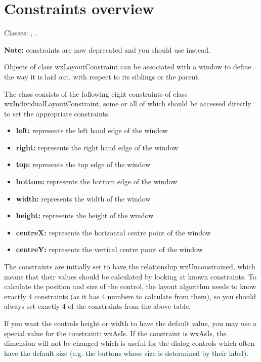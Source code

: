 \section{Constraints overview}\label{constraintsoverview}

Classes: , .

{\bf Note:} constraints are now deprecated and you should use  instead.

Objects of class wxLayoutConstraint can be associated with a window to define
the way it is laid out, with respect to its siblings or the parent.

The class consists of the following eight constraints of class wxIndividualLayoutConstraint,
some or all of which should be accessed directly to set the appropriate
constraints.

\begin{itemize}\itemsep=0pt
\item {\bf left:} represents the left hand edge of the window
\item {\bf right:} represents the right hand edge of the window
\item {\bf top:} represents the top edge of the window
\item {\bf bottom:} represents the bottom edge of the window
\item {\bf width:} represents the width of the window
\item {\bf height:} represents the height of the window
\item {\bf centreX:} represents the horizontal centre point of the window
\item {\bf centreY:} represents the vertical centre point of the window
\end{itemize}

The constraints are initially set to have the relationship wxUnconstrained,
which means that their values should be calculated by looking at known constraints.
To calculate the position and size of the control, the layout algorithm needs to
know exactly 4 constraints (as it has 4 numbers to calculate from them), so you
should always set exactly 4 of the constraints from the above table.

If you want the controls height or width to have the default value, you may use
a special value for the constraint: wxAsIs. If the constraint is wxAsIs, the
dimension will not be changed which is useful for the dialog controls which
often have the default size (e.g. the buttons whose size is determined by their
label).

